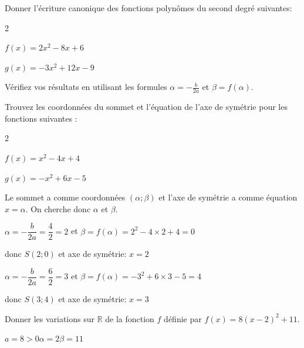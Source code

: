 \documentclass[11pt,a4paper]{article}  %
\begin{document}
\exercice{}

Donner l'écriture canonique des fonctions polynômes du second degré suivantes:
\begin{multicols}{2}
	\begin{enumMet}
		\item \( f(x) = 2x^2 - 8x + 6 \)
		\item \( g(x) = -3x^2 + 12x - 9 \)
	\end{enumMet}
\end{multicols}
Vérifiez vos résultats en utilisant les formules \( \alpha = -\frac{b}{2a} \) et \( \beta = f(\alpha) \).

\exercice{}

Trouvez les coordonnées du sommet et l'équation de l'axe de symétrie pour les fonctions suivantes :
\begin{multicols}{2}
	\begin{enumMet}
		\item \( f(x) = x^2 - 4x + 4 \)
		\item \( g(x) = -x^2 + 6x - 5 \)
	\end{enumMet}
\end{multicols}

\begin{corrBox}
	Le sommet a comme coordonnées $(\alpha;\beta)$ et l'axe de symétrie a comme équation $x=\alpha$. On cherche donc $\alpha$ et $\beta$.
	\begin{enumMet}
		\item $\alpha=-\dfrac{b}{2a}=\dfrac{4}{2}=2$ et $\beta=f(\alpha)=2^2-4\times 2+4=0$
		
		donc $S(2;0)$ et axe de symétrie: $x=2$
		
		\item $\alpha=-\dfrac{b}{2a}=\dfrac{6}{2}=3$ et $\beta=f(\alpha)=-3^2+6\times 3-5=4$
		
		donc $S(3;4)$ et axe de symétrie: $x=3$
	\end{enumMet}	
\end{corrBox}



Donner les variations sur $\mathbb{R}$ de la fonction $f$ définie par $f(x)=8(x-2)^2+11$.

\begin{corrBox}
$a=8>0$\quad \quad \quad $\alpha=2$\quad \quad \quad $\beta=11$

\end{corrBox}
\end{document}
